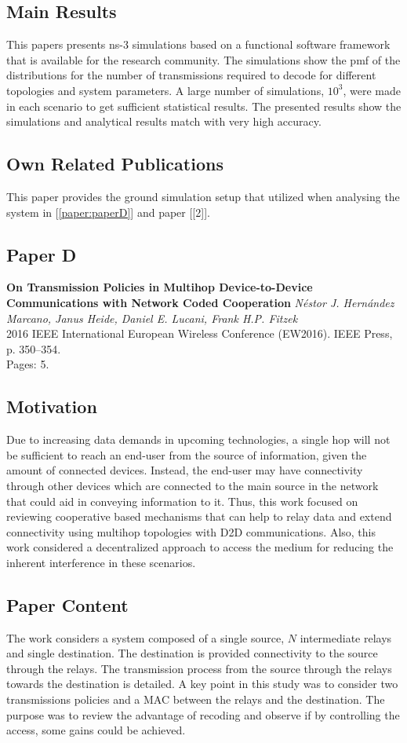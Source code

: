 \subsection*{Main Results}
This papers presents ns-3 simulations based on a functional software framework that is available for the research community. The simulations show the \ac{pmf} of the distributions for the number of transmissions required to decode for different topologies and system parameters. A large number of simulations, $10^3$, were made in each scenario to get sufficient statistical results. The presented results show the simulations and analytical results match with very high accuracy.

\subsection*{Own Related Publications}
This paper provides the ground simulation setup that utilized when analysing the system in [\ref{paper:paperD}] and paper [{[2]}].

\clearpage

\subsection{Paper D}
\textbf{On Transmission Policies in Multihop Device-to-Device Communications
with Network Coded Cooperation}
\textit{N\'estor J. Hern\'andez Marcano, Janus Heide, Daniel E. Lucani, Frank H.P. Fitzek}
\\  2016 IEEE International European Wireless Conference (EW2016). IEEE Press, p. 350--354.
\\ Pages: 5.
\subsection*{Motivation}
Due to increasing data demands in upcoming technologies, a single hop will not be sufficient to reach an end-user from the source of information, given the amount of connected devices. Instead, the end-user may have connectivity through other devices which are connected to the main source in the network that could aid in conveying information to it. Thus, this work focused on reviewing cooperative based mechanisms that can help to relay data and extend connectivity using multihop topologies with \ac{D2D} communications. Also, this work considered a decentralized approach to access the medium for reducing the inherent interference in these scenarios.

 \subsection*{Paper Content}
The work considers a system composed of a single source, $N$ intermediate relays and single destination. The destination is provided connectivity to the source through the relays. The transmission process from the source through the relays towards the destination is detailed. A key point in this study was to consider two transmissions policies and a \ac{MAC} between the relays and the destination. The purpose was to review the advantage of recoding and observe if by controlling the access, some gains could be achieved.

